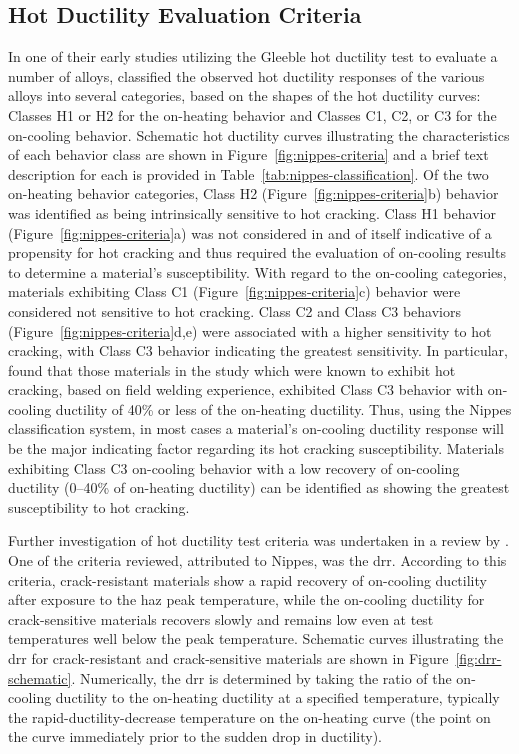\subsection{Hot Ductility Evaluation Criteria}
In one of their early studies utilizing the Gleeble hot ductility test to evaluate a number of alloys, \citet{nippes_further_1957} classified the observed hot ductility responses of the various alloys into several categories, based on the shapes of the hot ductility curves: Classes H1 or H2 for the on-heating behavior and Classes C1, C2, or C3 for the on-cooling behavior. Schematic hot ductility curves illustrating the characteristics of each behavior class are shown in Figure~\ref{fig:nippes-criteria} and a brief text description for each is provided in Table~\ref{tab:nippes-classification}. Of the two on-heating behavior categories, Class H2 (Figure~\ref{fig:nippes-criteria}b) behavior was identified as being intrinsically sensitive to hot cracking. Class H1 behavior (Figure~\ref{fig:nippes-criteria}a) was not considered in and of itself indicative of a propensity for hot cracking and thus required the evaluation of on-cooling results to determine a material's susceptibility. With regard to the on-cooling categories, materials exhibiting Class C1 (Figure~\ref{fig:nippes-criteria}c) behavior were considered not sensitive to hot cracking. Class C2 and Class C3 behaviors (Figure~\ref{fig:nippes-criteria}d,e) were associated with a higher sensitivity to hot cracking, with Class C3 behavior indicating the greatest sensitivity. In particular, \citeauthor{nippes_further_1957} found that those materials in the study which were known to exhibit hot cracking, based on field welding experience, exhibited Class C3 behavior with on-cooling ductility of 40\% or less of the on-heating ductility. Thus, using the Nippes classification system, in most cases a material's on-cooling ductility response will be the major indicating factor regarding its hot cracking susceptibility. Materials exhibiting Class C3 on-cooling behavior with a low recovery of on-cooling ductility (0--40\% of on-heating ductility) can be identified as showing the greatest susceptibility to hot cracking.

Further investigation of hot ductility test criteria was undertaken in a review by \citet{yeniscavich_correlation_1970}. One of the criteria reviewed, attributed to Nippes, was the \gls{drr}. According to this criteria, crack-resistant materials show a rapid recovery of on-cooling ductility after exposure to the \gls{haz} peak temperature, while the on-cooling ductility for crack-sensitive materials recovers slowly and remains low even at test temperatures well below the peak temperature. Schematic curves illustrating the \gls{drr} for crack-resistant and crack-sensitive materials are shown in Figure~\ref{fig:drr-schematic}. Numerically, the \gls{drr} is determined by taking the ratio of the on-cooling ductility to the on-heating ductility at a specified temperature, typically the rapid-ductility-decrease temperature on the on-heating curve (the point on the curve immediately prior to the sudden drop in ductility).


